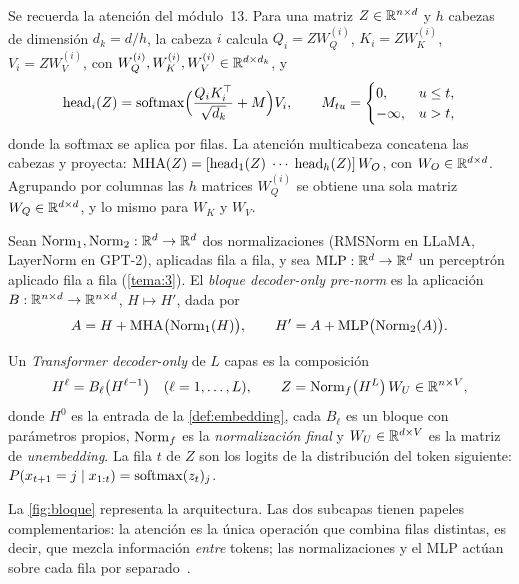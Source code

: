 Se recuerda la atención del módulo~13. Para una matriz $Z\in\mathbb{R}^{n\times d}$ y $h$ cabezas de dimensión $d_k=d/h$, la cabeza $i$ calcula $Q_i=ZW_Q^{(i)}$, $K_i=ZW_K^{(i)}$, $V_i=ZW_V^{(i)}$, con $W_Q^{(i)},W_K^{(i)},W_V^{(i)}\in\mathbb{R}^{d\times d_k}$, y
\[
\operatorname{head}_i(Z)=\operatorname{softmax}\Bigl(\frac{Q_iK_i^{\top}}{\sqrt{d_k}}+M\Bigr)V_i,\qquad
M_{tu}=\begin{cases}0,& u\le t,\\ -\infty,& u>t,\end{cases}
\]
donde la softmax se aplica por filas. La atención multicabeza concatena las cabezas y proyecta: $\operatorname{MHA}(Z)=[\operatorname{head}_1(Z)\;\cdots\;\operatorname{head}_h(Z)]\,W_O$, con $W_O\in\mathbb{R}^{d\times d}$. Agrupando por columnas las $h$ matrices $W_Q^{(i)}$ se obtiene una sola matriz $W_Q\in\mathbb{R}^{d\times d}$, y lo mismo para $W_K$ y $W_V$.

\begin{definicion}\label{def:bloque}
Sean $\operatorname{Norm}_1,\operatorname{Norm}_2:\mathbb{R}^{d}\to\mathbb{R}^{d}$ dos normalizaciones (RMSNorm en LLaMA, LayerNorm en GPT-2), aplicadas fila a fila, y sea $\operatorname{MLP}:\mathbb{R}^{d}\to\mathbb{R}^{d}$ un perceptrón aplicado fila a fila (\cref{tema:3}). El \emph{bloque decoder-only pre-norm} es la aplicación $B:\mathbb{R}^{n\times d}\to\mathbb{R}^{n\times d}$, $H\mapsto H'$, dada por
\[
A=H+\operatorname{MHA}\bigl(\operatorname{Norm}_1(H)\bigr),\qquad H'=A+\operatorname{MLP}\bigl(\operatorname{Norm}_2(A)\bigr).
\]
\end{definicion}

\begin{definicion}\label{def:transformer}
Un \emph{Transformer decoder-only} de $L$ capas es la composición
\[
H^{\ell}=B_\ell\bigl(H^{\ell-1}\bigr)\quad(\ell=1,\dots,L),\qquad Z=\operatorname{Norm}_f\bigl(H^{L}\bigr)\,W_U\in\mathbb{R}^{n\times V},
\]
donde $H^{0}$ es la entrada de la \cref{def:embedding}, cada $B_\ell$ es un bloque con parámetros propios, $\operatorname{Norm}_f$ es la \emph{normalización final} y $W_U\in\mathbb{R}^{d\times V}$ es la matriz de \emph{unembedding}. La fila $t$ de $Z$ son los logits de la distribución del token siguiente: $P(x_{t+1}=j\mid x_{1:t})=\operatorname{softmax}(z_t)_j$.
\end{definicion}

La \cref{fig:bloque} representa la arquitectura. Las dos subcapas tienen papeles complementarios: la atención es la única operación que combina filas distintas, es decir, que mezcla información \emph{entre} tokens; las normalizaciones y el MLP actúan sobre cada fila por separado~\cite[§7.2]{jm3}.

